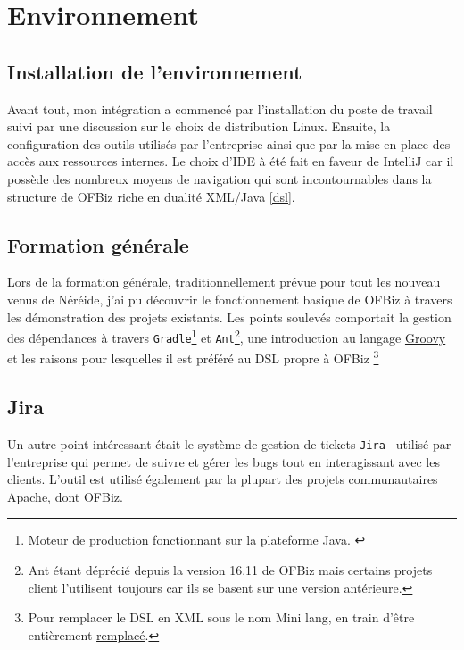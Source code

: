 \newpage









\section{Environnement}

\subsection{Installation de l'environnement}
Avant tout, mon intégration a commencé par l'installation du poste de travail suivi par une discussion sur le choix de distribution Linux. Ensuite, la configuration des outils utilisés par l'entreprise ainsi que par la mise en place des accès aux ressources internes. Le choix d'IDE à été fait en faveur de IntelliJ car il possède des nombreux moyens de navigation qui sont incontournables dans la structure de OFBiz riche en dualité XML/Java \ref{dsl}. 




\subsection{Formation générale}


Lors de la formation générale, traditionnellement prévue pour tout les nouveau venus de Néréide, j'ai pu découvrir le fonctionnement basique de OFBiz à travers les démonstration des projets existants. Les points soulevés comportait la gestion des dépendances à travers \verb|Gradle|\footnote{\href{https://gradle.org/}{Moteur de production fonctionnant sur la plateforme Java. }} et \verb|Ant|\footnote{Ant étant déprécié depuis la version 16.11 de OFBiz mais certains projets client l'utilisent toujours car ils se basent sur une version antérieure.  }, une introduction au langage \href{http://groovy-lang.org/}{Groovy} et les raisons pour lesquelles il est préféré au DSL propre à OFBiz \footnote{Pour remplacer le DSL en XML  sous le nom Mini lang, en train d'être entièrement \href{https://cwiki.apache.org/confluence/display/OFBIZ/Mini+Lang+Deprecation}{remplacé}. }


\subsection{Jira}
Un autre point intéressant était le système de gestion de tickets \verb|Jira | utilisé par l'entreprise qui permet de suivre et gérer les bugs tout en interagissant avec les clients. L'outil est utilisé également par la plupart des projets communautaires Apache, dont OFBiz.

